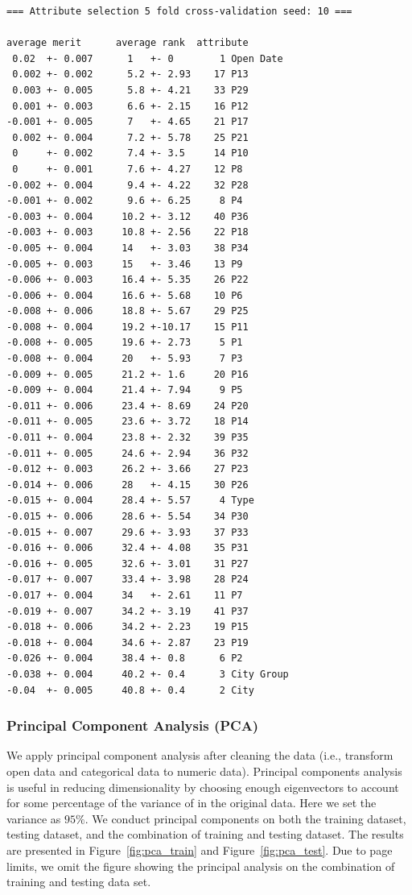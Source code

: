 \documentclass[10pt, oneside]{article}   	%
\begin{document}
{\scriptsize
\begin{verbatim}
=== Attribute selection 5 fold cross-validation seed: 10 ===

average merit      average rank  attribute
 0.02  +- 0.007      1   +- 0        1 Open Date
 0.002 +- 0.002      5.2 +- 2.93    17 P13
 0.003 +- 0.005      5.8 +- 4.21    33 P29
 0.001 +- 0.003      6.6 +- 2.15    16 P12
-0.001 +- 0.005      7   +- 4.65    21 P17
 0.002 +- 0.004      7.2 +- 5.78    25 P21
 0     +- 0.002      7.4 +- 3.5     14 P10
 0     +- 0.001      7.6 +- 4.27    12 P8
-0.002 +- 0.004      9.4 +- 4.22    32 P28
-0.001 +- 0.002      9.6 +- 6.25     8 P4
-0.003 +- 0.004     10.2 +- 3.12    40 P36
-0.003 +- 0.003     10.8 +- 2.56    22 P18
-0.005 +- 0.004     14   +- 3.03    38 P34
-0.005 +- 0.003     15   +- 3.46    13 P9
-0.006 +- 0.003     16.4 +- 5.35    26 P22
-0.006 +- 0.004     16.6 +- 5.68    10 P6
-0.008 +- 0.006     18.8 +- 5.67    29 P25
-0.008 +- 0.004     19.2 +-10.17    15 P11
-0.008 +- 0.005     19.6 +- 2.73     5 P1
-0.008 +- 0.004     20   +- 5.93     7 P3
-0.009 +- 0.005     21.2 +- 1.6     20 P16
-0.009 +- 0.004     21.4 +- 7.94     9 P5
-0.011 +- 0.006     23.4 +- 8.69    24 P20
-0.011 +- 0.005     23.6 +- 3.72    18 P14
-0.011 +- 0.004     23.8 +- 2.32    39 P35
-0.011 +- 0.005     24.6 +- 2.94    36 P32
-0.012 +- 0.003     26.2 +- 3.66    27 P23
-0.014 +- 0.006     28   +- 4.15    30 P26
-0.015 +- 0.004     28.4 +- 5.57     4 Type
-0.015 +- 0.006     28.6 +- 5.54    34 P30
-0.015 +- 0.007     29.6 +- 3.93    37 P33
-0.016 +- 0.006     32.4 +- 4.08    35 P31
-0.016 +- 0.005     32.6 +- 3.01    31 P27
-0.017 +- 0.007     33.4 +- 3.98    28 P24
-0.017 +- 0.004     34   +- 2.61    11 P7
-0.019 +- 0.007     34.2 +- 3.19    41 P37
-0.018 +- 0.006     34.2 +- 2.23    19 P15
-0.018 +- 0.004     34.6 +- 2.87    23 P19
-0.026 +- 0.004     38.4 +- 0.8      6 P2
-0.038 +- 0.004     40.2 +- 0.4      3 City Group
-0.04  +- 0.005     40.8 +- 0.4      2 City
 \end{verbatim}
}


\subsubsection{Principal Component Analysis (PCA)} We apply principal component analysis after cleaning the data (i.e., transform open data and categorical data to numeric data). Principal components analysis is useful in reducing dimensionality by choosing enough eigenvectors to account for some percentage of the variance of in the original data. Here we set the variance as $95\%$. We conduct principal components on both the training dataset, testing dataset, and the combination of training and testing dataset. The results are presented in Figure~\ref{fig:pca_train} and Figure~\ref{fig:pca_test}. Due to page limits, we omit the figure showing the principal analysis on the combination of training and testing data set. 
\end{document}
